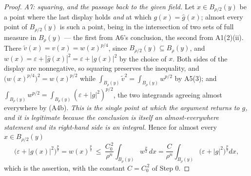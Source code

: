 \begin{proof}
\emph{A7: squaring, and the passage back to the given field.}  Let
$x\in B_{\rho/2}(y)$ be a point where the last display holds \emph{and} at which
$g(x)=\hat g(x)$; almost every point of $B_{\rho/2}(y)$ is such a point, being
in the intersection of two sets of full measure in $B_\rho(y)$ --- the first
from A6's conclusion, the second from A1(2)(ii).  There
$\tilde v(x)=v(x)=w(x)^{p/4}$, since $B_{\rho/2}(y)\subseteq B_\rho(y)$, and
$w(x)=\varepsilon+|\hat g(x)|^2=\varepsilon+|g(x)|^2$ by the choice of $x$.
Both sides of the display are nonnegative, so squaring preserves the inequality,
and $\bigl(w(x)^{p/4}\bigr)^2=w(x)^{p/2}$ while
$\int_{B_\rho(y)}\tilde v^2=\int_{B_\rho(y)}w^{p/2}$ by A5(3); and
$\int_{B_\rho(y)}w^{p/2}=\int_{B_\rho(y)}(\varepsilon+|g|^2)^{p/2}$, the two
integrands agreeing almost everywhere by (A4b).  \emph{This is the single point
at which the argument returns to $g$, and it is legitimate because the
conclusion is itself an almost-everywhere statement and its right-hand side is
an integral.}  Hence for almost every $x\in B_{\rho/2}(y)$
\[
\bigl(\varepsilon+|g(x)|^2\bigr)^{\frac p2}=w(x)^{\frac p2}
\ \le\ \frac{C_0^{\,2}}{\rho^n}\int_{B_\rho(y)}w^{\frac p2}\,dx
=\frac{C}{\rho^n}\int_{B_\rho(y)}\bigl(\varepsilon+|g|^2\bigr)^{\frac p2}dx ,
\]
which is the assertion, with the constant $C=C_0^{\,2}$ of Step 0.
\end{proof}
